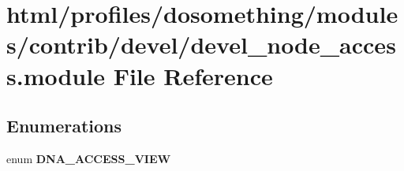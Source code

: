 \hypertarget{devel__node__access_8module}{
\section{html/profiles/dosomething/modules/contrib/devel/devel\_\-node\_\-access.module File Reference}
\label{devel__node__access_8module}
}
\subsection*{Enumerations}
\begin{DoxyCompactItemize}
\item 
enum {\bfseries DNA\_\-ACCESS\_\-VIEW} 
\end{DoxyCompactItemize}
